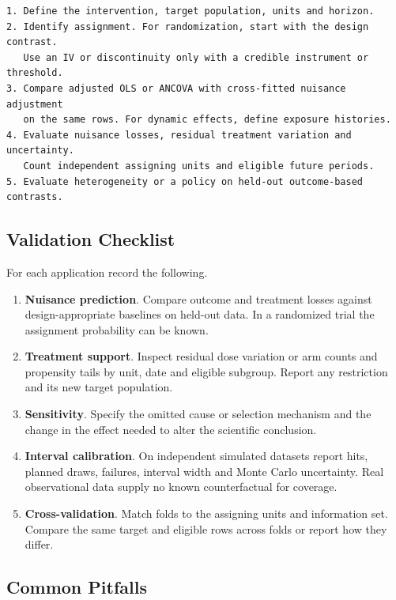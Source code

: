 \begin{verbatim}
1. Define the intervention, target population, units and horizon.
2. Identify assignment. For randomization, start with the design contrast.
   Use an IV or discontinuity only with a credible instrument or threshold.
3. Compare adjusted OLS or ANCOVA with cross-fitted nuisance adjustment
   on the same rows. For dynamic effects, define exposure histories.
4. Evaluate nuisance losses, residual treatment variation and uncertainty.
   Count independent assigning units and eligible future periods.
5. Evaluate heterogeneity or a policy on held-out outcome-based contrasts.
\end{verbatim}

\subsection{Validation Checklist}

For each application record the following.

\begin{enumerate}
\item \textbf{Nuisance prediction}. Compare outcome and treatment losses against design-appropriate baselines on held-out data. In a randomized trial the assignment probability can be known.
\item \textbf{Treatment support}. Inspect residual dose variation or arm counts and propensity tails by unit, date and eligible subgroup. Report any restriction and its new target population.
\item \textbf{Sensitivity}. Specify the omitted cause or selection mechanism and the change in the effect needed to alter the scientific conclusion.
\item \textbf{Interval calibration}. On independent simulated datasets report hits, planned draws, failures, interval width and Monte Carlo uncertainty. Real observational data supply no known counterfactual for coverage.
\item \textbf{Cross-validation}. Match folds to the assigning units and information set. Compare the same target and eligible rows across folds or report how they differ.
\end{enumerate}

\subsection{Common Pitfalls}

%

